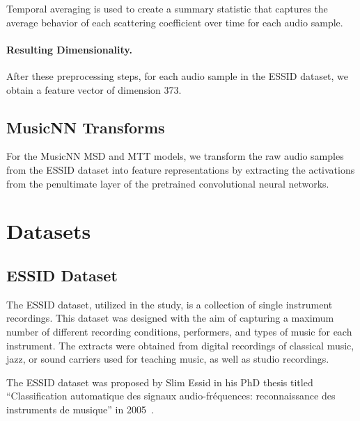 Temporal averaging is used to create a summary statistic that captures the average behavior of each scattering coefficient over time for each audio sample.

\paragraph{Resulting Dimensionality.}
After these preprocessing steps, for each audio sample in the ESSID dataset, we obtain a feature vector of dimension 373.

\subsection{MusicNN Transforms}

For the MusicNN MSD and MTT models, we transform the raw audio samples from the ESSID dataset into feature representations by extracting the activations from the penultimate layer of the pretrained convolutional neural networks.


\section{Datasets}

\subsection{ESSID Dataset}

The ESSID dataset, utilized in the study, is a collection of single instrument recordings. This dataset was designed with the aim of capturing a maximum number of different recording conditions, performers, and types of music for each instrument. The extracts were obtained from digital recordings of classical music, jazz, or sound carriers used for teaching music, as well as studio recordings.

The ESSID dataset was proposed by Slim Essid in his PhD thesis titled ``Classification automatique des signaux audio-fr\'{e}quences: reconnaissance des instruments de musique'' in 2005~\cite{essid2005classification}.

